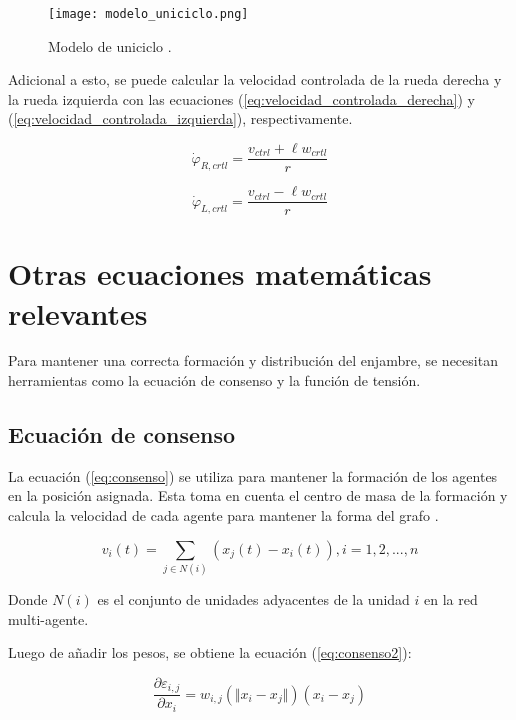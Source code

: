 \begin{figure}[H]
	\centering
	\texttt{[image: modelo\_uniciclo.png]}
	\caption{Modelo de uniciclo \cite{ZeaM_modelo_uniciclo}.}
	\label{fig:modelo_uniciclo}
\end{figure}

Adicional a esto, se puede calcular la velocidad controlada de la rueda derecha y la rueda izquierda con las ecuaciones (\ref{eq:velocidad_controlada_derecha}) y (\ref{eq:velocidad_controlada_izquierda}), respectivamente.

\begin{equation}
	\dot{\varphi}_{R,crtl} = \frac{v_{ctrl} + \ell w_{crtl}}{r}
	\label{eq:velocidad_controlada_derecha}
\end{equation}

\begin{equation}
	\dot{\varphi}_{L,crtl} = \frac{v_{ctrl} - \ell w_{crtl}}{r}
	\label{eq:velocidad_controlada_izquierda}
\end{equation}

\section{Otras ecuaciones matemáticas relevantes}
Para mantener una correcta formación y distribución del enjambre, se necesitan herramientas como la ecuación de consenso y la función de tensión.

\subsection{Ecuación de consenso}
La ecuación (\ref{eq:consenso}) se utiliza para mantener la formación de los agentes en la posición asignada. Esta toma en cuenta el centro de masa de la formación y calcula la velocidad de cada agente para mantener la forma del grafo \cite{PenaAM_2019_tesis}.

\begin{equation}
	v_i(t) = \sum_{j \in N(i)} (x_j(t) - x_i(t)), i = 1, 2, ..., n
	\label{eq:consenso}
\end{equation}

Donde $N(i)$ es el conjunto de unidades adyacentes de la unidad $i$ en la red multi-agente.

Luego de añadir los pesos, se obtiene la ecuación (\ref{eq:consenso2}):

\begin{equation}
	\frac{\partial \varepsilon_{i,j}}{\partial x_i} = w_{i,j}(\Vert x_i - x_j \Vert)(x_i - x_j)
	\label{eq:consenso2}
\end{equation}

